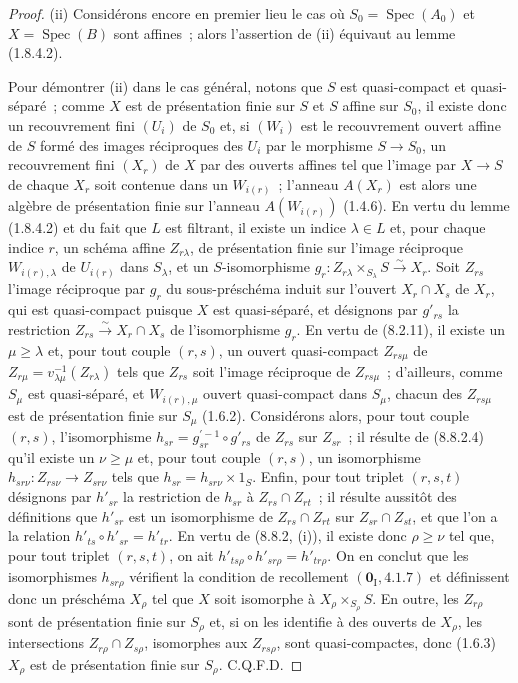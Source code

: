 \begin{proof}
(ii) Considérons encore en premier lieu le cas où $S_0=\operatorname{Spec}(A_0)$ et
$X=\operatorname{Spec}(B)$ sont affines~; alors l'assertion de (ii) équivaut
au lemme (1.8.4.2).

Pour démontrer (ii) dans le cas général, notons que $S$ est quasi-compact et
quasi-séparé~; comme $X$ est de présentation finie sur $S$ et $S$ affine sur
$S_0$, il existe donc un recouvrement fini $(U_i)$ de $S_0$ et, si $(W_i)$ est
le recouvrement ouvert affine de $S$ formé des images réciproques des $U_i$
par le morphisme $S\to S_0$, un recouvrement fini $(X_r)$ de $X$ par des
ouverts affines tel que l'image par $X\to S$ de chaque $X_r$ soit contenue
dans un $W_{i(r)}$~; l'anneau $A(X_r)$ est alors une algèbre de présentation
finie sur l'anneau $A(W_{i(r)})$ (1.4.6). En vertu du lemme (1.8.4.2) et du
fait que $L$ est filtrant, il existe un indice $\lambda\in L$ et, pour chaque
indice $r$, un schéma affine $Z_{r\lambda}$, de présentation finie sur l'image
réciproque $W_{i(r),\lambda}$ de $U_{i(r)}$ dans $S_\lambda$, et un
$S$-isomorphisme
$g_r:Z_{r\lambda}\times_{S_\lambda}S\xrightarrow{\sim}X_r$. Soit $Z_{rs}$
l'image réciproque par $g_r$ du sous-préschéma induit sur l'ouvert
$X_r\cap X_s$ de $X_r$, qui est quasi-compact puisque $X$ est quasi-séparé,
et désignons par $g'_{rs}$ la restriction
$Z_{rs}\xrightarrow{\sim}X_r\cap X_s$ de l'isomorphisme $g_r$. En vertu de
(8.2.11), il existe un $\mu\geq\lambda$ et, pour tout couple $(r,s)$, un
ouvert quasi-compact $Z_{rs\mu}$ de
$Z_{r\mu}=v_{\lambda\mu}^{-1}(Z_{r\lambda})$ tels que $Z_{rs}$ soit l'image
réciproque de $Z_{rs\mu}$~; d'ailleurs, comme $S_\mu$ est quasi-séparé, et
$W_{i(r),\mu}$ ouvert quasi-compact dans $S_\mu$, chacun des $Z_{rs\mu}$ est
de présentation finie sur $S_\mu$ (1.6.2). Considérons alors, pour tout
couple $(r,s)$, l'isomorphisme
$h_{sr}=g_{sr}^{'-1}\circ g'_{rs}$ de $Z_{rs}$ sur $Z_{sr}$~; il résulte de
(8.8.2.4) qu'il existe un $\nu\geq\mu$ et, pour tout couple $(r,s)$, un
isomorphisme $h_{sr\nu}:Z_{rs\nu}\to Z_{sr\nu}$ tels que
$h_{sr}=h_{sr\nu}\times1_S$. Enfin, pour tout triplet $(r,s,t)$ désignons par
$h'_{sr}$ la restriction de $h_{sr}$ à
$Z_{rs}\cap Z_{rt}$~; il résulte aussitôt des définitions que $h'_{sr}$ est un
isomorphisme de $Z_{rs}\cap Z_{rt}$ sur $Z_{sr}\cap Z_{st}$, et que l'on a la
relation $h'_{ts}\circ h'_{sr}=h'_{tr}$. En vertu de (8.8.2, (i)), il existe
donc $\rho\geq\nu$ tel que, pour tout triplet $(r,s,t)$, on ait
$h'_{ts\rho}\circ h'_{sr\rho}=h'_{tr\rho}$. On en conclut que les
isomorphismes $h_{sr\rho}$ vérifient la condition de recollement
$(\mathbf{0}_{\mathrm I}, 4.1.7)$ et définissent donc un préschéma $X_\rho$ tel que $X$
soit isomorphe à $X_\rho\times_{S_\rho}S$. En outre, les $Z_{r\rho}$ sont de
présentation finie sur $S_\rho$ et, si on les identifie à des ouverts de
$X_\rho$, les intersections $Z_{r\rho}\cap Z_{s\rho}$, isomorphes aux
$Z_{rs\rho}$, sont quasi-compactes, donc (1.6.3) $X_\rho$ est de
présentation finie sur $S_\rho$. C.Q.F.D.
\end{proof}

